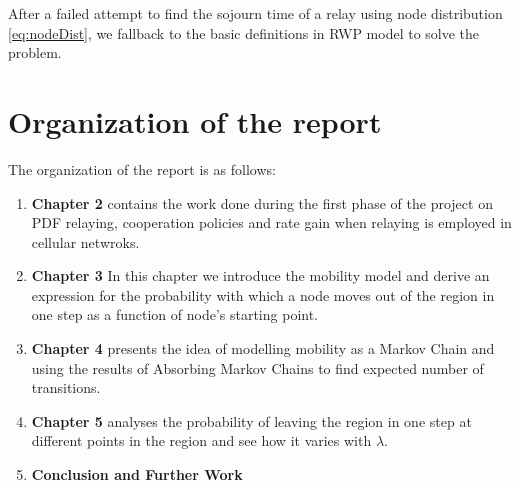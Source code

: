 	After a failed attempt to find the sojourn time of a relay using node distribution \ref{eq:nodeDist}, we fallback to the basic definitions in RWP model to solve the problem.   


\section*{Organization of the report}
The organization of the report is as follows:
\begin{enumerate}

	\item \textbf{Chapter 2} contains the work done during the first phase of the project on PDF relaying, cooperation policies and rate gain when relaying is employed in cellular netwroks.  

	\item \textbf{Chapter 3} In this chapter we introduce the mobility model and derive an expression for the probability with which a node moves out of the region in one step as a function of node's starting point.  

	\item \textbf{Chapter 4} presents the idea of modelling mobility as a Markov Chain and using the results of Absorbing Markov Chains to find expected number of transitions.

	\item \textbf{Chapter 5} analyses the probability of leaving the region in one step at different points in the region and see how it varies with $\lambda$. 

	\item \textbf{Conclusion and Further Work}

\end{enumerate}


